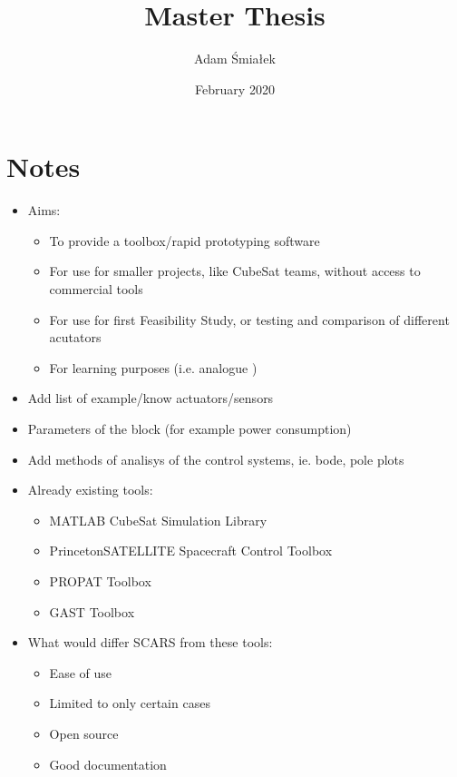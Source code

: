 \documentclass{article}
\title{Master Thesis}
\author{Adam Śmiałek}
\date{February 2020}
\begin{document}
\makeatletter
\renewcommand\@dotsep{240}   %
\makeatother
\tableofcontents
\clearpage


\section*{Notes}
\begin{itemize}
    \item Aims:
    \begin{itemize}
        \item To provide a toolbox/rapid prototyping software
        \item For use for smaller projects, like CubeSat teams, without access to commercial tools
        \item For use for first Feasibility Study, or testing and comparison of different acutators
        \item For learning purposes (i.e. analogue ) 
    \end{itemize}
    \item Add list of example/know actuators/sensors
    \item Parameters of the block (for example power consumption)
    \item Add methods of analisys of the control systems, ie. bode, pole plots 
    \item Already existing tools:
    \begin{itemize}
            \item MATLAB CubeSat Simulation Library
            \item PrincetonSATELLITE Spacecraft Control Toolbox
            \item PROPAT Toolbox
            \item GAST Toolbox
          \end{itemize}
    \item What would differ SCARS from these tools:
    \begin{itemize}
            \item Ease of use
            \item Limited to only certain cases
            \item Open source
            \item Good documentation
        \end{itemize}
\end{itemize}
\end{document}

